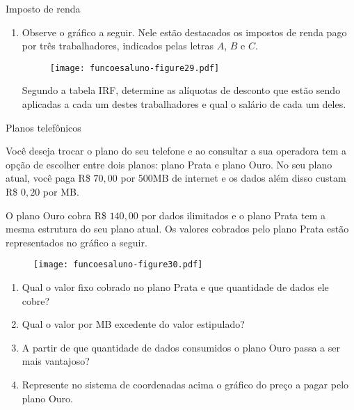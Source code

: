 \documentclass[extrafontsizes, twoside, 11pt, openright, final]{memoir}
\begin{document}
\begin{task}{Imposto de renda}
\begin{enumerate}
		      Determine o imposto que deverá ser pago por um trabalhador cujo rendimento seja:
		      \begin{enumerate}
			      \item R\$ $1.750{,}00$
			      \item R\$ $2.680{,}00$
			      \item R\$ $4.060{,}00$
			      \item R\$ $5.500{,}00$
		      \end{enumerate}

		\item Observe o gráfico a seguir. Nele estão destacados os impostos de renda pago por três trabalhadores, indicados pelas letras $A$, $B$ e $C$.

		      \begin{figure}[H]
			      \begin{center}
				      \centering

				      \texttt{[image: funcoesaluno-figure29.pdf]}
			      \end{center}
		      \end{figure}

		      Segundo a tabela IRF, determine as alíquotas de desconto que estão sendo aplicadas a cada um destes trabalhadores e qual o salário de cada um deles.
	\end{enumerate}

\end{task}

\clearpage
\begin{task}{Planos telefônicos}

	Você deseja trocar o plano do seu telefone e ao consultar a sua operadora tem a opção de escolher entre dois planos: plano Prata e plano Ouro. No seu plano atual, você paga R\$ $70{,}00$ por 500MB de internet e os dados além disso custam R\$ $0{,}20$ por MB.

	O plano Ouro cobra R\$ $140{,}00$ por dados ilimitados e o plano Prata tem a mesma estrutura do seu plano atual. Os valores cobrados pelo plano Prata estão representados no gráfico a seguir.

	\begin{figure}[H]
		\begin{center}
			\centering


			\texttt{[image: funcoesaluno-figure30.pdf]}
		\end{center}
	\end{figure}

	\begin{enumerate}
		\item Qual o valor fixo cobrado no plano Prata e que quantidade de dados ele cobre?
		\item Qual o valor por MB excedente do valor estipulado?
		\item A partir de que quantidade de dados consumidos o plano Ouro passa a ser mais vantajoso?
		\item Represente no sistema de coordenadas acima o gráfico do preço a pagar pelo plano Ouro.
	\end{enumerate}

\end{task}
\end{document}
